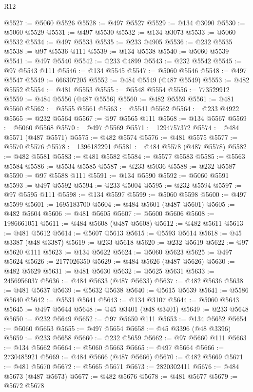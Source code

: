 \begin{lexlean}{R12}
\begin{coremodule}
{{{{{{{{{{{{{{{{{{{{{{{{{{{{{{{{{{{{{{{{{{{{{{{{{{{{{{{{{{{{{{{{{{{{{{{{{{{{{{{{{{@5527 := @5060 @5526
@5528 := @497 @5527
@5529 := @134 @3090
@5530 := @5060 @5529
@5531 := @497 @5530
@5532 := @134 @3073
@5533 := @5060 @5532
@5534 := @497 @5533
@5535 := @233 @4905
@5536 := @232 @5535
@5538 := @97 @5536 @111
@5539 := @134 @5538
@5540 := @5060 @5539
@5541 := @497 @5540
@5542 := @233 @4899
@5543 := @232 @5542
@5545 := @97 @5543 @111
@5546 := @134 @5545
@5547 := @5060 @5546
@5548 := @497 @5547
@5549 := 666307205
@5552 := @484 @5549 (@487 @5549)
@5553 := @482 @5552
@5554 := @481 @5553
@5555 := @5548 @5554
@5556 := 773529912
@5559 := @484 @5556 (@487 @5556)
@5560 := @482 @5559
@5561 := @481 @5560
@5562 := @5555 @5561
@5563 := @5541 @5562
@5564 := @233 @4922
@5565 := @232 @5564
@5567 := @97 @5565 @111
@5568 := @134 @5567
@5569 := @5060 @5568
@5570 := @497 @5569
@5571 := 1294757372
@5574 := @484 @5571 (@487 @5571)
@5575 := @482 @5574
@5576 := @481 @5575
@5577 := @5570 @5576
@5578 := 1396182291
@5581 := @484 @5578 (@487 @5578)
@5582 := @482 @5581
@5583 := @481 @5582
@5584 := @5577 @5583
@5585 := @5563 @5584
@5586 := @5534 @5585
@5587 := @233 @5036
@5588 := @232 @5587
@5590 := @97 @5588 @111
@5591 := @134 @5590
@5592 := @5060 @5591
@5593 := @497 @5592
@5594 := @233 @5004
@5595 := @232 @5594
@5597 := @97 @5595 @111
@5598 := @134 @5597
@5599 := @5060 @5598
@5600 := @497 @5599
@5601 := 1695183700
@5604 := @484 @5601 (@487 @5601)
@5605 := @482 @5604
@5606 := @481 @5605
@5607 := @5600 @5606
@5608 := 1986661051
@5611 := @484 @5608 (@487 @5608)
@5612 := @482 @5611
@5613 := @481 @5612
@5614 := @5607 @5613
@5615 := @5593 @5614
@5618 := @45 @3387 (@48 @3387)
@5619 := @233 @5618
@5620 := @232 @5619
@5622 := @97 @5620 @111
@5623 := @134 @5622
@5624 := @5060 @5623
@5625 := @497 @5624
@5626 := 2177026350
@5629 := @484 @5626 (@487 @5626)
@5630 := @482 @5629
@5631 := @481 @5630
@5632 := @5625 @5631
@5633 := 2456956037
@5636 := @484 @5633 (@487 @5633)
@5637 := @482 @5636
@5638 := @481 @5637
@5639 := @5632 @5638
@5640 := @5615 @5639
@5641 := @5586 @5640
@5642 := @5531 @5641
@5643 := @134 @3107
@5644 := @5060 @5643
@5645 := @497 @5644
@5648 := @45 @3401 (@48 @3401)
@5649 := @233 @5648
@5650 := @232 @5649
@5652 := @97 @5650 @111
@5653 := @134 @5652
@5654 := @5060 @5653
@5655 := @497 @5654
@5658 := @45 @3396 (@48 @3396)
@5659 := @233 @5658
@5660 := @232 @5659
@5662 := @97 @5660 @111
@5663 := @134 @5662
@5664 := @5060 @5663
@5665 := @497 @5664
@5666 := 2730485921
@5669 := @484 @5666 (@487 @5666)
@5670 := @482 @5669
@5671 := @481 @5670
@5672 := @5665 @5671
@5673 := 2820302411
@5676 := @484 @5673 (@487 @5673)
@5677 := @482 @5676
@5678 := @481 @5677
@5679 := @5672 @5678
}}}}}}}}}}}}}}}}}}}}}}}}}}}}}}}}}}}}}}}}}}}}}}}}}}}}}}}}}}}}}}}}}}}}}}}}}}}}}}}}}}
\end{coremodule}
\end{lexlean}
